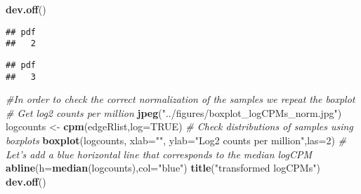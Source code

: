 \documentclass[]{article}
\newenvironment{Shaded}{\begin{snugshade}}{\end{snugshade}}
\newcommand{\CommentTok}[1]{\textcolor[rgb]{0.56,0.35,0.01}{\textit{#1}}}
\newcommand{\DataTypeTok}[1]{\textcolor[rgb]{0.13,0.29,0.53}{#1}}
\newcommand{\DecValTok}[1]{\textcolor[rgb]{0.00,0.00,0.81}{#1}}
\newcommand{\KeywordTok}[1]{\textcolor[rgb]{0.13,0.29,0.53}{\textbf{#1}}}
\newcommand{\NormalTok}[1]{#1}
\newcommand{\OperatorTok}[1]{\textcolor[rgb]{0.81,0.36,0.00}{\textbf{#1}}}
\newcommand{\OtherTok}[1]{\textcolor[rgb]{0.56,0.35,0.01}{#1}}
\newcommand{\StringTok}[1]{\textcolor[rgb]{0.31,0.60,0.02}{#1}}
\begin{document}
\begin{Shaded}
\begin{Highlighting}[]
\KeywordTok{dev.off}\NormalTok{()}
\end{Highlighting}
\end{Shaded}

\begin{verbatim}
## pdf 
##   2
\end{verbatim}

\begin{Shaded}
\end{Shaded}

\begin{verbatim}
## pdf 
##   3
\end{verbatim}

\begin{Shaded}
\begin{Highlighting}[]
\CommentTok{#In order to check the correct normalization of the samples we repeat the boxplot}
\CommentTok{# Get log2 counts per million}
\KeywordTok{jpeg}\NormalTok{(}\StringTok{"../figures/boxplot_logCPMs_norm.jpg"}\NormalTok{)}
\NormalTok{logcounts <-}\StringTok{ }\KeywordTok{cpm}\NormalTok{(edgeRlist,}\DataTypeTok{log=}\OtherTok{TRUE}\NormalTok{)}
\CommentTok{# Check distributions of samples using boxplots}
\KeywordTok{boxplot}\NormalTok{(logcounts, }\DataTypeTok{xlab=}\StringTok{""}\NormalTok{, }\DataTypeTok{ylab=}\StringTok{"Log2 counts per million"}\NormalTok{,}\DataTypeTok{las=}\DecValTok{2}\NormalTok{)}
\CommentTok{# Let's add a blue horizontal line that corresponds to the median logCPM}
\KeywordTok{abline}\NormalTok{(}\DataTypeTok{h=}\KeywordTok{median}\NormalTok{(logcounts),}\DataTypeTok{col=}\StringTok{"blue"}\NormalTok{)}
\KeywordTok{title}\NormalTok{(}\StringTok{"transformed logCPMs"}\NormalTok{)}
\KeywordTok{dev.off}\NormalTok{()}
\end{Highlighting}
\end{Shaded}
\end{document}
